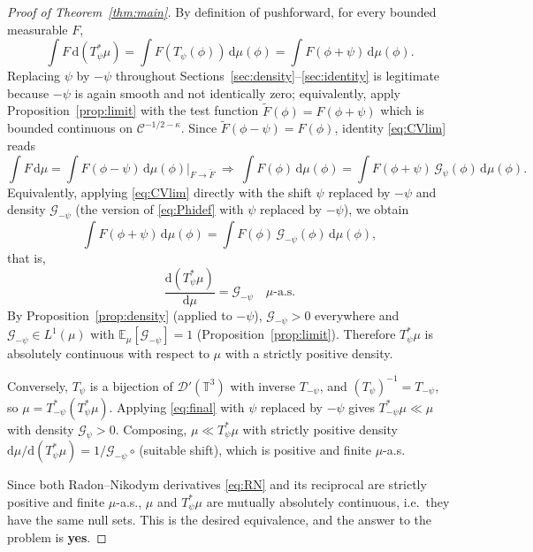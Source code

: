 \documentclass[12pt]{article}
\theoremstyle{definition}
\newcommand{\T}{\mathbb{T}^3}
\newcommand{\E}{\mathbb{E}}
\newcommand{\dd}{\mathrm{d}}
\begin{document}
\begin{proof}[Proof of Theorem~\ref{thm:main}]
By definition of pushforward, for every bounded measurable $F$,
\[
  \int F\,\dd(T_\psi^*\mu)=\int F(T_\psi(\phi))\,\dd\mu(\phi)=\int F(\phi+\psi)\,\dd\mu(\phi).
\]
Replacing $\psi$ by $-\psi$ throughout Sections~\ref{sec:density}--\ref{sec:identity}
is legitimate because $-\psi$ is again smooth and not identically zero; equivalently,
apply Proposition~\ref{prop:limit} with the test function $\widetilde F(\phi)=F(\phi+\psi)$
which is bounded continuous on $\mathcal C^{-1/2-\kappa}$. Since
$\widetilde F(\phi-\psi)=F(\phi)$, identity \eqref{eq:CVlim} reads
\begin{equation}\label{eq:pushdens}
  \int F\,\dd\mu=\int F(\phi-\psi)\,\dd\mu(\phi)\Big|_{F\to\widetilde F}
  \ \Longrightarrow\
  \int F(\phi)\,\dd\mu(\phi)=\int F(\phi+\psi)\,\mathcal G_\psi(\phi)\,\dd\mu(\phi).
\end{equation}
Equivalently, applying \eqref{eq:CVlim} directly with the shift $\psi$ replaced by
$-\psi$ and density $\mathcal G_{-\psi}$ (the version of \eqref{eq:Phidef} with $\psi$
replaced by $-\psi$), we obtain
\begin{equation}\label{eq:final}
  \int F(\phi+\psi)\,\dd\mu(\phi)=\int F(\phi)\,\mathcal G_{-\psi}(\phi)\,\dd\mu(\phi),
\end{equation}
that is,
\begin{equation}\label{eq:RN}
  \frac{\dd(T_\psi^*\mu)}{\dd\mu}=\mathcal G_{-\psi}\quad\mu\text{-a.s.}
\end{equation}
By Proposition~\ref{prop:density} (applied to $-\psi$), $\mathcal G_{-\psi}>0$ everywhere
and $\mathcal G_{-\psi}\in L^1(\mu)$ with $\E_\mu[\mathcal G_{-\psi}]=1$
(Proposition~\ref{prop:limit}). Therefore $T_\psi^*\mu$ is absolutely continuous with
respect to $\mu$ with a strictly positive density.

Conversely, $T_\psi$ is a bijection of $\mathcal D'(\T)$ with inverse $T_{-\psi}$, and
$(T_\psi)^{-1}=T_{-\psi}$, so $\mu=T_{-\psi}^*(T_\psi^*\mu)$. Applying \eqref{eq:final}
with $\psi$ replaced by $-\psi$ gives $T_{-\psi}^*\mu\ll\mu$ with density
$\mathcal G_{\psi}>0$. Composing, $\mu\ll T_\psi^*\mu$ with strictly positive density
$\dd\mu/\dd(T_\psi^*\mu)=1/\mathcal G_{-\psi}\circ$\,(suitable shift), which is positive
and finite $\mu$-a.s.

Since both Radon--Nikodym derivatives \eqref{eq:RN} and its reciprocal are strictly
positive and finite $\mu$-a.s., $\mu$ and $T_\psi^*\mu$ are mutually absolutely
continuous, i.e.\ they have the same null sets. This is the desired equivalence, and the
answer to the problem is \textbf{yes}.
\end{proof}
\end{document}
